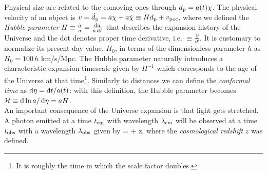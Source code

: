 \ee
%
Physical size are related to the comoving ones through $d_{\rm p} = a(t)\chi$.  
The physical velocity of an object is $v = \dot{d}_{\rm p} = \dot{a}\chi + a\dot{\chi} \equiv Hd_{\rm p} + 
v_{\rm pec}$, where we defined the \emph{Hubble parameter} $H \equiv \frac{\dot{a}}{a} = \frac{\diff a}{a\diff t}$ that describes the expansion history of the Universe and the dot denotes proper time derivative, i.e. $\dot{} \equiv \frac{\partial}{\partial t}$. It is customary to normalize its present 
day value, $H_0$, in terms of the dimensionless parameter $h$ as $H_0 = 100\,h$ km/s/Mpc.  
The Hubble parameter naturally introduces a  characteristic expansion timescale given by $H^{-1}$ 
which corresponds to the age of the Universe at that time\footnote{It is roughly the time in which the 
scale factor doubles.}. Similarly to distances we can define the \emph{conformal time} as 
$\diff \eta = \diff t / a(t)$: with this definition, the Hubble parameter becomes $\mathcal{H} \equiv \diff\ln{a}/
\diff\eta = aH$. \\
An important consequence of the Universe expansion is that light gets stretched. A photon emitted at a 
time $t_{\rm{em}}$ with wavelength $\lambda_{\rm{em}}$ will be observed at a time $t_{\rm{obs}}$ with a 
wavelength $\lambda_{\rm{obs}}$ given by
%
\be
{} =   + z,
\ee
%
where the \emph{cosmological redshift} $z$ was defined. 

